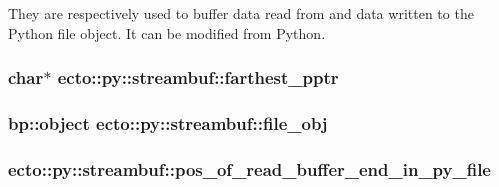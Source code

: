 They are respectively used to buffer data read from and data written to the Python file object. It can be modified from Python. \hypertarget{classecto_1_1py_1_1streambuf_a8267e360cfb0201b1518a0dfd3d7c353}{
\subsubsection[{farthest\-\_\-pptr}]{\setlength{\rightskip}{0pt plus 5cm}char$\ast$ ecto\-::py\-::streambuf\-::farthest\-\_\-pptr\hspace{0.3cm}{\ttfamily [private]}}}\label{classecto_1_1py_1_1streambuf_a8267e360cfb0201b1518a0dfd3d7c353}
\hypertarget{classecto_1_1py_1_1streambuf_a63254ed85f60504895f526272e19dd34}{
\subsubsection[{file\-\_\-obj}]{\setlength{\rightskip}{0pt plus 5cm}bp\-::object ecto\-::py\-::streambuf\-::file\-\_\-obj}}\label{classecto_1_1py_1_1streambuf_a63254ed85f60504895f526272e19dd34}
\hypertarget{classecto_1_1py_1_1streambuf_a7b219ca66aa176fdfbc9d6fb63d15cef}{
\subsubsection[{pos\-\_\-of\-\_\-read\-\_\-buffer\-\_\-end\-\_\-in\-\_\-py\-\_\-file}]{ ecto\-::py\-::streambuf\-::pos\-\_\-of\-\_\-read\-\_\-buffer\-\_\-end\-\_\-in\-\_\-py\-\_\-file\hspace{0.3cm}{\ttfamily [private]}}}\label{classecto_1_1py_1_1streambuf_a7b219ca66aa176fdfbc9d6fb63d15cef}
